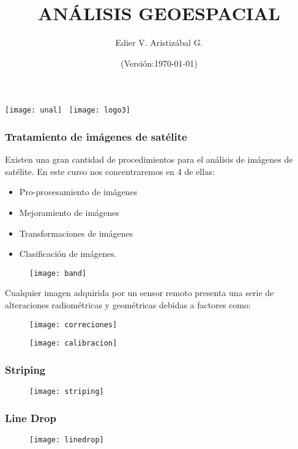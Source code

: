 \documentclass[14pt]{beamer}
\title[Tratamiento de Imágenes]{ANÁLISIS GEOESPACIAL}
\author[Edier Aristizábal]{Edier V. Aristizábal G.}
\institute{\emph{evaristizabalg@unal.edu.co}}
\date{\tiny{(Versión:\today)}}
\begin{document}
\begin{frame}
\titlepage
\centering
	\texttt{[image: unal]}\hspace*{4.75cm}~%
   	\texttt{[image: logo3]}
\end{frame}
\begin{frame}
\frametitle{Tratamiento de imágenes de satélite}
\scriptsize{Existen una gran cantidad de procedimientos para el análisis de imágenes de satélite. En este curso nos concentraremos en 4 de ellas:}
\begin{itemize}
\item Pro-procesamiento de imágenes
\item Mejoramiento de imágenes
\item Transformaciones de imágenes
\item Clasificación de imágenes.
\end{itemize}
  \begin{figure}
    \centering
    \texttt{[image: band]}
  \end{figure}
\end{frame}
\begin{frame}
\small{Cualquier imagen adquirida por un sensor remoto presenta una serie de alteraciones radiométricas y geométricas debidas a factores como:}
  \begin{figure}
    \centering
    \texttt{[image: correciones]}
  \end{figure}
\end{frame}
\begin{frame}
\scriptsize{}
  \begin{figure}
    \centering
    \texttt{[image: calibracion]}
  \end{figure}
\end{frame}
\begin{frame}
\frametitle{Striping}
\scriptsize{}
  \begin{figure}
    \centering
    \texttt{[image: striping]}
  \end{figure}
\end{frame}
\begin{frame}
\frametitle{Line Drop}
\scriptsize{}
  \begin{figure}
    \centering
    \texttt{[image: linedrop]}
  \end{figure}
\end{frame}
\end{document}
